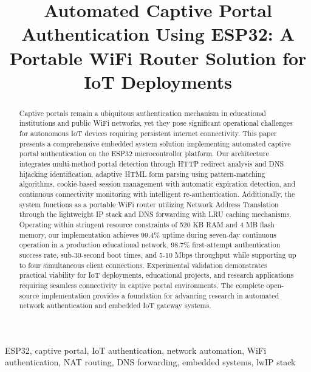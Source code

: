 \documentclass[conference]{IEEEtran}
\begin{document}
\title{Automated Captive Portal Authentication Using ESP32: A Portable WiFi Router Solution for IoT Deployments}

\author{
}

\maketitle

\begin{abstract}
Captive portals remain a ubiquitous authentication mechanism in educational institutions and public WiFi networks, yet they pose significant operational challenges for autonomous IoT devices requiring persistent internet connectivity. This paper presents a comprehensive embedded system solution implementing automated captive portal authentication on the ESP32 microcontroller platform. Our architecture integrates multi-method portal detection through HTTP redirect analysis and DNS hijacking identification, adaptive HTML form parsing using pattern-matching algorithms, cookie-based session management with automatic expiration detection, and continuous connectivity monitoring with intelligent re-authentication. Additionally, the system functions as a portable WiFi router utilizing Network Address Translation through the lightweight IP stack and DNS forwarding with LRU caching mechanisms. Operating within stringent resource constraints of 520 KB RAM and 4 MB flash memory, our implementation achieves 99.4\% uptime during seven-day continuous operation in a production educational network, 98.7\% first-attempt authentication success rate, sub-30-second boot times, and 5-10 Mbps throughput while supporting up to four simultaneous client connections. Experimental validation demonstrates practical viability for IoT deployments, educational projects, and research applications requiring seamless connectivity in captive portal environments. The complete open-source implementation provides a foundation for advancing research in automated network authentication and embedded IoT gateway systems.
\end{abstract}

\begin{IEEEkeywords}
ESP32, captive portal, IoT authentication, network automation, WiFi authentication, NAT routing, DNS forwarding, embedded systems, lwIP stack
\end{IEEEkeywords}
\end{document}
